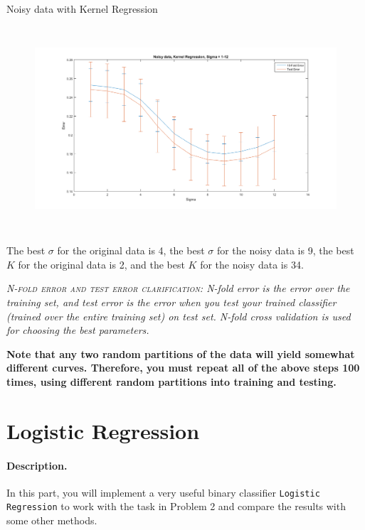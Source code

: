 \documentclass[english]{article}
\begin{document}
\begin{itemize}
Noisy data with Kernel Regression
\begin{figure}[H]
\centering
\includegraphics[width=7in, height=3in]{kern_noisy_varySIGMA.png}
\end{figure}
 
 The best $\sigma$ for the original data is 4, the best $\sigma$ for the noisy data is 9, the best $K$ for the original data is 2, and the best $K$ for the noisy data is 34.


\end{itemize}

\emph{\textsc{N-fold error and test error clarification:} N-fold error is the error over the training set, and test error is the error when you test your trained classifier (trained over the entire training set) on test set. N-fold cross validation is used for choosing the best parameters. }

 {\bf Note that any two random partitions of the data will yield somewhat different curves. Therefore, you must repeat all of the above steps 100 times, using different random partitions into training and testing.}

\section{Logistic Regression }

\paragraph{Description.} In this part, you will implement a very useful binary classifier {\tt Logistic Regression} to work with the task in Problem 2 and compare the results with some other methods. 
\end{document}
